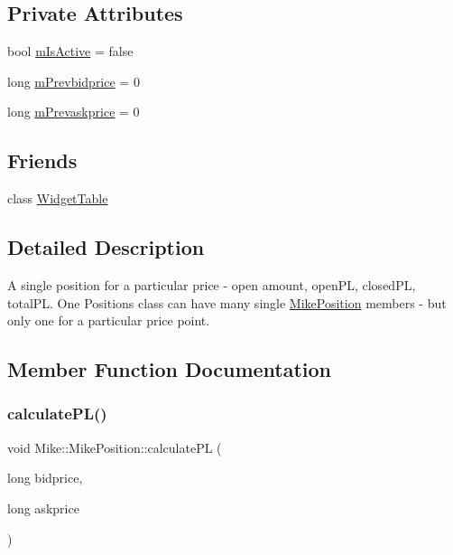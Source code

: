 \subsection*{Private Attributes}
\begin{DoxyCompactItemize}
\item 
bool \hyperlink{class_mike_1_1_mike_position_ad02c9d99e625e381926c8b59d137dd39}{m\+Is\+Active} = false
\item 
long \hyperlink{class_mike_1_1_mike_position_a84c3a8e75acb7fb08097c9c08e97d72d}{m\+Prevbidprice} = 0
\item 
long \hyperlink{class_mike_1_1_mike_position_a607eb417a9553d4c32177f2e95d761ce}{m\+Prevaskprice} = 0
\end{DoxyCompactItemize}
\subsection*{Friends}
\begin{DoxyCompactItemize}
\item 
class \hyperlink{class_mike_1_1_mike_position_abcbb78a2aa9a92d43c9ea7c42cbc681e}{Widget\+Table}
\end{DoxyCompactItemize}


\subsection{Detailed Description}
A single position for a particular price -\/ open amount, open\+PL, closed\+PL, total\+PL. One Positions class can have many single \hyperlink{class_mike_1_1_mike_position}{Mike\+Position} members -\/ but only one for a particular price point. 

\subsection{Member Function Documentation}
\mbox{\label{class_mike_1_1_mike_position_a4530507292631b2accf01cf35c49103b}} 
\subsubsection{\texorpdfstring{calculate\+P\+L()}{calculatePL()}}
{\footnotesize\ttfamily void Mike\+::\+Mike\+Position\+::calculate\+PL (\begin{DoxyParamCaption}\item[{long}]{bidprice,  }\item[{long}]{askprice }\end{DoxyParamCaption})\hspace{0.3cm}{\ttfamily [inline]}}

